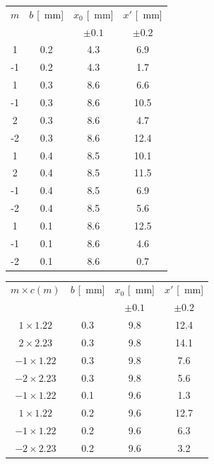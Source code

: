 \documentclass[10pt,oneside,a4paper]{article}
\begin{document}
\begin{minipage}[t]{.5\linewidth}
\vspace{0cm}
\begin{center}
\label{tab:misuraLambda1}
\begin{tabular}{c|c|c|c}
$m$ & $b$ [\SI{}{mm}] & $x_0$ [\SI{}{mm}] & $x'$ [\SI{}{mm}]\\
 & & $\pm 0.1$ & $\pm 0.2$\\
\hline
  1 & 0.2 & 4.3 &6.9  \\
 -1 & 0.2 & 4.3 & 1.7  \\
  1 & 0.3 & 8.6 &6.6  \\
 -1 & 0.3 & 8.6 &10.5 \\
  2 & 0.3 & 8.6 &4.7  \\
 -2 & 0.3 & 8.6 &12.4 \\
  1 & 0.4 & 8.5 &10.1 \\
  2 & 0.4 & 8.5 &11.5  \\
 -1 & 0.4 & 8.5 & 6.9  \\
 -2 & 0.4 & 8.5 & 5.6  \\
  1 & 0.1 & 8.6 &12.5 \\
 -1 & 0.1 & 8.6 & 4.6  \\
 -2 & 0.1 & 8.6 & 0.7  \\
\hline
\end{tabular}
\end{center}
\end{minipage}
\quad
\begin{minipage}[t]{.5\linewidth}
\vspace{0cm}
\begin{center}
\label{tab:misuraLambda2}
\begin{tabular}{c|c|c|c}
$m \times c(m)$ & $b$ [\SI{}{mm}] & $x_0$ [\SI{}{mm}] & $x'$ [\SI{}{mm}]\\
 & & $\pm 0.1$ & $\pm 0.2$\\
\hline
  $1 \times 1.22$ & 0.3 & 9.8 & 12.4 \\
  $2 \times 2.23$ & 0.3 & 9.8 & 14.1 \\
 $-1 \times 1.22$ & 0.3 & 9.8 &  7.6  \\
 $-2 \times 2.23$ & 0.3 & 9.8 &  5.6  \\
 $-1 \times 1.22$ & 0.1 & 9.6 &  1.3  \\
 $1 \times 1.22$ & 0.2 & 9.6 &  12.7\\
 $-1 \times 1.22$ & 0.2 & 9.6 &  6.3  \\
 $-2 \times 2.23$ & 0.2 & 9.6 &  3.2  \\
\hline
\end{tabular}
\end{center}
\end{minipage}
\end{document}
